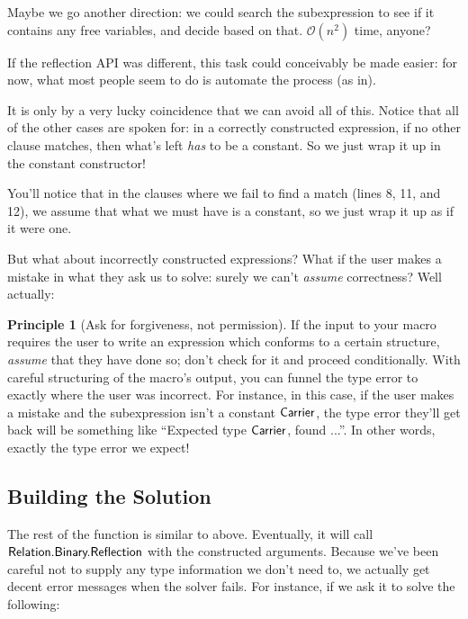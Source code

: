 \documentclass[draft, twocolumn]{article}
\theoremstyle{definition}
\theoremstyle{definition}
\newtheorem{principle}{Principle}[section]
\begin{document}
Maybe we go another direction: we could search the subexpression to see if it
contains any free variables, and decide based on that. \(\mathcal{O}(n^2)\)
time, anyone?

If the reflection API was different, this task could conceivably be made easier:
for now, what most people seem to do is automate the process (as
in\cite{norell_agda-prelude_2018}).

It is only by a very lucky coincidence that we can avoid all of this. Notice
that all of the other cases are spoken for: in a correctly constructed
expression, if no other clause matches, then what's left \emph{has} to be a
constant. So we just wrap it up in the constant constructor!

\resetlinenumber[1]

\begin{linenumbers}
\end{linenumbers}

You'll notice that in the clauses where we fail to find a match (lines 8, 11,
and 12), we assume that what we must have is a constant, so we just wrap it up
as if it were one. 

But what about incorrectly constructed expressions? What if the user makes a
mistake in what they ask us to solve: surely we can't \emph{assume} correctness?
Well actually:

\begin{principle}[Ask for forgiveness, not permission]
  If the input to your macro requires the user to write an expression which
  conforms to a certain structure, \emph{assume} that they have done so; don't
  check for it and proceed conditionally. With careful structuring of the
  macro's output, you can funnel the type error to exactly where the user was
  incorrect. For instance, in this case, if the user makes a mistake and the
  subexpression isn't a constant \(\AgdaDatatype{Carrier}\), the type error
  they'll get back will be something like ``Expected type
  \(\AgdaDatatype{Carrier}\), found ...''. In other words, exactly the type
  error we expect!
\end{principle}

\subsection{Building the Solution}
The rest of the function is similar to above. Eventually, it will call
\(\AgdaModule{Relation.Binary.Reflection}\) with the constructed arguments.
Because we've been careful not to supply any type information we don't need to,
we actually get decent error messages when the solver fails. For instance, if we
ask it to solve the following:
\end{document}
